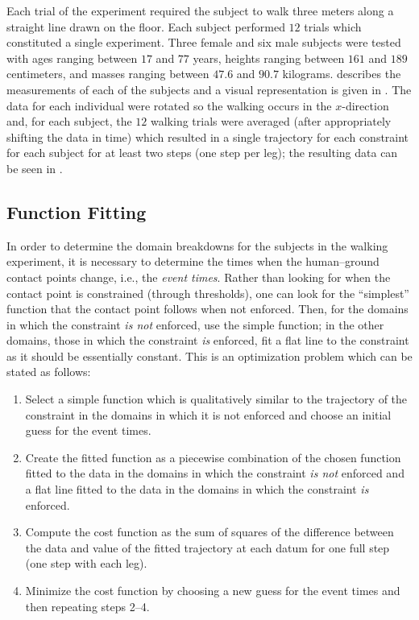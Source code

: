Each trial of the experiment required the subject to walk three meters along a
straight line drawn on the floor.
%
Each subject performed $12$ trials which constituted a single experiment.
%
Three female and six male subjects were tested with ages ranging between $17$
and $77$ years, heights ranging between $161$ and $189$ centimeters, and masses
ranging between $47.6$ and $90.7$ kilograms.
%
 describes the measurements of each of the subjects and
a visual representation is given in .
%
The data for each individual were rotated so the walking occurs in the
$x$-direction and, for each subject, the $12$ walking trials were averaged
(after appropriately shifting the data in time) which resulted in a single
trajectory for each constraint for each subject for at least two steps (one step
per leg); the resulting data can be seen in .


\subsection{Function Fitting}

In order to determine the domain breakdowns for the subjects in the walking
experiment, it is necessary to determine the times when the human--ground
contact points change, i.e., the {\em event times}.
%
Rather than looking for when the contact point is constrained (through
thresholds), one can look for the ``simplest'' function that the contact point
follows when not enforced.
%
Then, for the domains in which the constraint {\em is not} enforced, use the
simple function; in the other domains, those in which the constraint {\em is}
enforced, fit a flat line to the constraint as it should be essentially
constant.
%
This is an optimization problem which can be stated as follows:
\begin{enumerate}
\item Select a simple function which is qualitatively similar to the trajectory
  of the constraint in the domains in which it is not enforced and choose an
  initial guess for the event times.
\item Create the fitted function as a piecewise combination of the chosen
  function fitted to the data in the domains in which the constraint {\em is
    not} enforced and a flat line fitted to the data in the domains in which
  the constraint {\em is} enforced.
\item Compute the cost function as the sum of squares of the difference between
  the data and value of the fitted trajectory at each datum for one full step
  (one step with each leg).
\item Minimize the cost function by choosing a new guess for the event times
  and then repeating steps 2--4.
\end{enumerate}

